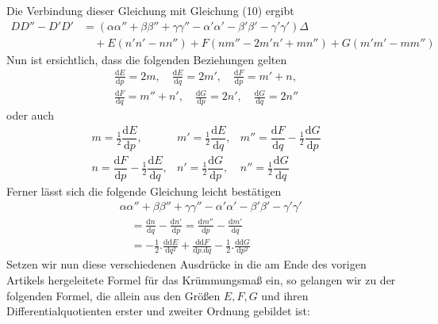 \par\indent{}%
Die Verbindung dieser Gleichung mit Gleichung (10) ergibt
\begingroup\fontsize{10}{12}\selectfont
\[
\begin{aligned}
DD''-D'D'&=(\alpha\alpha''+\beta\beta''+\gamma\gamma''-\alpha'\alpha'-\beta'\beta'-\gamma'\gamma')\Delta\\
&\quad+E(n'n'-nn'')+F(nm''-2m'n'+mn'')+G(m'm'-mm'')
\end{aligned}
\]
\endgroup
Nun ist ersichtlich, dass die folgenden Beziehungen gelten
\[
\begin{gathered}
\frac{\mathrm{d}E}{\mathrm{d}p}=2m,\quad\frac{\mathrm{d}E}{\mathrm{d}q}=2m',\quad\frac{\mathrm{d}F}{\mathrm{d}p}=m'+n,\\
\frac{\mathrm{d}F}{\mathrm{d}q}=m''+n',\quad\frac{\mathrm{d}G}{\mathrm{d}p}=2n',\quad\frac{\mathrm{d}G}{\mathrm{d}q}=2n''
\end{gathered}
\]
oder auch
\[
\begin{array}{lll}
m=\tfrac{1}{2}\dfrac{\mathrm{d}E}{\mathrm{d}p},&m'=\tfrac{1}{2}\dfrac{\mathrm{d}E}{\mathrm{d}q},&m''=\dfrac{\mathrm{d}F}{\mathrm{d}q}-\tfrac{1}{2}\dfrac{\mathrm{d}G}{\mathrm{d}p}\\[6pt]
n=\dfrac{\mathrm{d}F}{\mathrm{d}p}-\tfrac{1}{2}\dfrac{\mathrm{d}E}{\mathrm{d}q},&n'=\tfrac{1}{2}\dfrac{\mathrm{d}G}{\mathrm{d}p},&n''=\tfrac{1}{2}\dfrac{\mathrm{d}G}{\mathrm{d}q}
\end{array}
\]
Ferner lässt sich die folgende Gleichung leicht bestätigen
\[
\begin{aligned}
&\alpha\alpha''+\beta\beta''+\gamma\gamma''-\alpha'\alpha'-\beta'\beta'-\gamma'\gamma'\\
&\quad=\frac{\mathrm{d}n}{\mathrm{d}q}-\frac{\mathrm{d}n'}{\mathrm{d}p}=\frac{\mathrm{d}m''}{\mathrm{d}p}-\frac{\mathrm{d}m'}{\mathrm{d}q}\\
&\quad=-\tfrac{1}{2}\mathord{.}\frac{\mathrm{d}\mathrm{d}E}{\mathrm{d}q^2}+\frac{\mathrm{d}\mathrm{d}F}{\mathrm{d}p\mathord{.}\mathrm{d}q}-\tfrac{1}{2}\mathord{.}\frac{\mathrm{d}\mathrm{d}G}{\mathrm{d}p^2}
\end{aligned}
\]
Setzen wir nun diese verschiedenen Ausdrücke in die am Ende des vorigen Artikels hergeleitete Formel für das Krümmungsmaß ein, so gelangen wir zu der folgenden Formel, die allein aus den Größen \(E,F,G\) und ihren Differentialquotienten erster und zweiter Ordnung gebildet ist:

